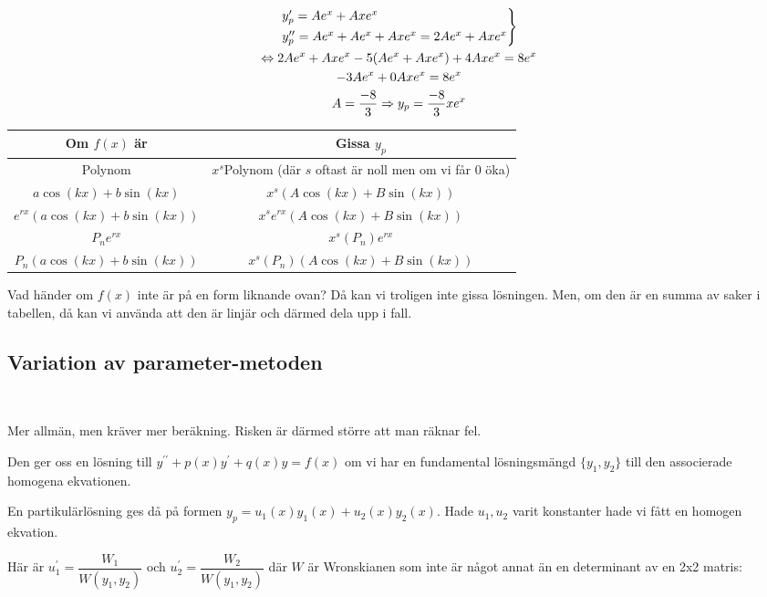 \begin{equation*}
  \begin{gathered}
    \begin{rcases*}
      y_p^{\prime} = Ae^x+Axe^x\\
      y_p^{\prime\prime}=Ae^x+Ae^x+Axe^x = 2Ae^x+Axe^x
    \end{rcases*}\\
    \Lrarr 2Ae^x+Axe^x-5(Ae^x+Axe^x)+4Axe^x=8e^x\\
    -3Ae^x+0Axe^x=8e^x\\
    A=\dfrac{-8}{3}\Rightarrow y_p=\dfrac{-8}{3}xe^x
  \end{gathered}
\end{equation*}
\par\bigskip

\begin{center}
  \begin{tabular}{|c|c|}
    \hline
    Om $f(x)$ är&Gissa $y_p$\\
    \hline
    Polynom&$x^s$Polynom (där $s$ oftast är noll men om vi får 0 öka)\\
    \hline
    $a\cos(kx)+b\sin(kx)$&$x^s(A\cos(kx)+B\sin(kx))$\\
    \hline
    $e^{rx}(a\cos(kx)+b\sin(kx))$&$x^se^{rx}(A\cos(kx)+B\sin(kx))$\\
    \hline
    $P_ne^{rx}$&$x^s(P_n)e^{rx}$\\
    \hline
    $P_n(a\cos(kx)+b\sin(kx))$&$x^s(P_n)(A\cos(kx)+B\sin(kx))$
  \end{tabular}
\end{center}
\par\bigskip
\noindent Vad händer om $f(x)$ inte är på en form liknande ovan? Då kan vi troligen inte gissa lösningen. Men, om den är en summa av saker i tabellen, då kan vi använda att den är linjär och därmed dela upp i fall.
\par\bigskip

\subsection{Variation av parameter-metoden}\hfill\\
\par\bigskip

\noindent Mer allmän, men kräver mer beräkning. Risken är därmed större att man räknar fel.
\par\bigskip
\noindent Den ger oss en lösning till $y^{\prime\prime}+p(x)y^{\prime}+q(x)y=f(x)$ om vi har en fundamental lösningsmängd $\{y_1, y_2\}$ till den associerade homogena ekvationen.
\par\bigskip
\noindent En partikulärlösning ges då på formen $y_p = u_1(x)y_1(x)+u_2(x)y_2(x)$. Hade $u_1, u_2$ varit konstanter hade vi fått en homogen ekvation.
\par\bigskip
\noindent Här är $u_1^{\prime} = \dfrac{W_1}{W(y_1, y_2)}$ och $u_2^{\prime} = \dfrac{W_2}{W(y_1, y_2)}$ där $W$ är Wronskianen som inte är något annat än en determinant av en 2x2 matris:


